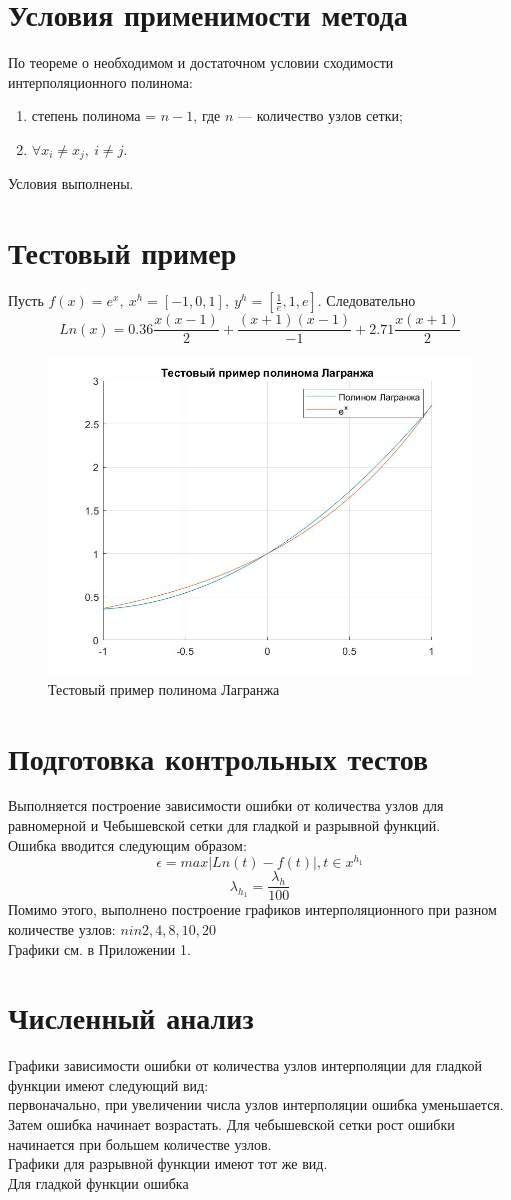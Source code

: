 \documentclass{article}
\begin{document}
\section{Условия применимости метода}
По теореме о необходимом и достаточном условии сходимости интерполяционного полинома:
\begin{enumerate}
	\item 
	степень полинома = $n-1$, где $n$ — количество узлов сетки;
	\item $\forall x_i \neq x_j,\ i \neq j$.
\end{enumerate} 
Условия выполнены.
\section{Тестовый пример}
Пусть $f(x) = e^x,\ x^h = [-1, 0, 1],\ y^h = [\frac{1}{e}, 1, e]$. Следовательно
$$Ln(x) = 0.36\frac{x(x-1)}{2}+\frac{(x+1)(x-1)}{-1}+2.71\frac{x(x+1)}{2}$$
\begin{figure}[H]
	\centering
	\includegraphics[width=0.7\linewidth]{test}
	\caption{Тестовый пример полинома Лагранжа}
	\label{fig:test}
\end{figure}
\section{Подготовка контрольных тестов}
Выполняется построение зависимости ошибки от количества узлов для равномерной и Чебышевской сетки для гладкой и разрывной функций.\\
Ошибка вводится следующим образом:
$$\epsilon = max|Ln(t) - f(t)|, t \in x^{h_1}$$
$$\lambda_{h_1} = \frac{\lambda_h}{100}$$
Помимо этого, выполнено построение графиков интерполяционного при разном количестве узлов: $n in {2, 4, 8, 10, 20}$\\
Графики см. в Приложении 1.\\

\section{Численный анализ}
Графики зависимости ошибки от количества узлов интерполяции для гладкой функции имеют следующий вид:\\ первоначально, при увеличении числа узлов интерполяции ошибка уменьшается. Затем ошибка начинает возрастать. Для чебышевской сетки рост ошибки начинается при большем количестве узлов.\\
Графики для разрывной функции имеют тот же вид.\\
Для гладкой функции ошибка
\end{document}
